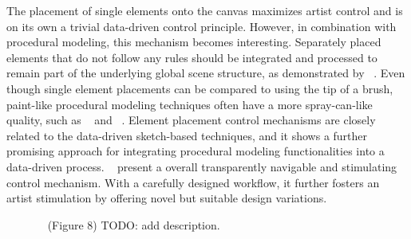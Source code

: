The placement of single elements onto the canvas maximizes artist control and is on its own a trivial data-driven control principle. However, in combination with procedural modeling, this mechanism becomes interesting. Separately placed elements that do not follow any rules should be integrated and processed to remain part of the underlying global scene structure, as demonstrated by \citeauthor*{gieseke_2017_ooo}~\cite{gieseke_2017_ooo}. Even though single element placements can be compared to using the tip of a brush, paint-like procedural modeling techniques often have a more spray-can-like quality, such as \citeauthor*{hsu_2020_aef}~\cite{hsu_2020_aef} and \citeauthor*{mech_2012_tdf}~\cite{mech_2012_tdf}. Element placement control mechanisms are closely related to the data-driven sketch-based techniques, and it shows a further promising approach for integrating procedural modeling functionalities into a data-driven process. \citeauthor*{guerrero_2016_pep}~\cite{guerrero_2016_pep} present a overall transparently navigable and stimulating control mechanism. With a carefully designed workflow, it further fosters an artist stimulation by offering novel but suitable design variations.

\begin{figure}[H]
    \centering
    \label{fig:guerrero_2016_pep}
    \caption{\citeauthor*{guerrero_2016_pep}~\cite{guerrero_2016_pep} (Figure 8) TODO: add description. \color{red}{Status rights: not started.}}
\end{figure}